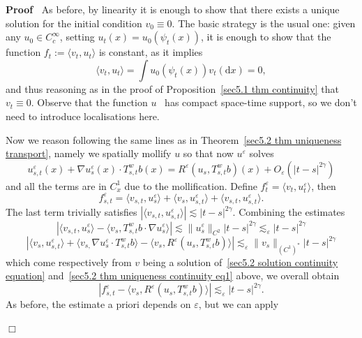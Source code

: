 \documentclass[10pt]{article}
\newcommand{\assign}{:=}
\newcommand{\mathd}{\mathrm{d}}
\newenvironment{proof}{\noindent\textbf{Proof\ }}{\hspace*{\fill}$\Box$\medskip}
\begin{document}
\begin{proof}
  As before, by linearity it is enough to show that there exists a unique
  solution for the initial condition $v_0 \equiv 0$. The basic strategy is the
  usual one: given any $u_0 \in C^{\infty}_c$, setting $u_t (x) = u_0 (\psi_t
  (x))$, it is enough to show that the function $f_t \assign \langle v_t, u_t
  \rangle$ is constant, as it implies
  \[ \langle v_t, u_t \rangle = \int u_0 (\psi_t (x)) v_t (\mathd x) = 0, \]
  and thus reasoning as in the proof of Proposition~\ref{sec5.1 thm
  continuity} that $v_t \equiv 0$. Observe that the function $u$ \ has compact
  space-time support, so we don't need to introduce localisations here.
  
  Now we reason following the same lines as in Theorem~\ref{sec5.2 thm
  uniqueness transport}, namely we spatially mollify $u$ so that now
  $u^{\varepsilon}$ solves
  \begin{equation}
    u^{\varepsilon}_{s, t} (x) + \nabla u^{\varepsilon}_s (x) \cdot T^w_{s, t}
    b (x) = R^{\varepsilon} (u_s, T^w_{s, t} b) (x) + O_{\varepsilon} (| t - s
    |^{2 \gamma}) \label{sec5.2 thm uniqueness continuity eq1}
  \end{equation}
  and all the terms are in $C^1_x$ due to the mollification. Define
  $f^{\varepsilon}_t = \langle v_t, u^{\varepsilon}_t \rangle$, then
  \[ f^{\varepsilon}_{s, t} = \langle v_{s, t}, u^{\varepsilon}_s \rangle +
     \langle v_s, u^{\varepsilon}_{s, t} \rangle + \langle v_{s, t},
     u^{\varepsilon}_{s, t} \rangle . \]
  The last term trivially satisfies $| \langle v_{s, t}, u^{\varepsilon}_{s,
  t} \rangle | \lesssim | t - s |^{2 \gamma}$. Combining the estimates
  \[ | \langle v_{s, t}, u^{\varepsilon}_s \rangle - \langle v_s, T^w_{s, t} b
     \cdot \nabla u^{\varepsilon}_s \rangle | \lesssim \| u^{\varepsilon}_s
     \|_{C^2} | t - s |^{2 \gamma} \lesssim_{\varepsilon} | t - s |^{2 \gamma}
  \]
  \[ | \langle v_s, u^{\varepsilon}_{s, t} \rangle + \langle v_{s,} \nabla
     u^{\varepsilon}_s \cdot T^w_{s, t} b \rangle - \langle v_s,
     R^{\varepsilon} (u_s, T^w_{s, t} b) \rangle | \lesssim_{\varepsilon} \|
     v_s \|_{(C^1)^{\ast}} | t - s |^{2 \gamma} \]
  which come respectively from $v$ being a solution of~{\eqref{sec5.2 solution
  continuity equation}} and~{\eqref{sec5.2 thm uniqueness continuity eq1}}
  above, we overall obtain
  \[ | f^{\varepsilon}_{s, t} - \langle v_s, R^{\varepsilon} (u_s, T^w_{s, t}
     b) \rangle | \lesssim_{\varepsilon} | t - s |^{2 \gamma} . \]
  As before, the estimate a priori depends on $\varepsilon$, but we can apply

\end{proof}
\end{document}
